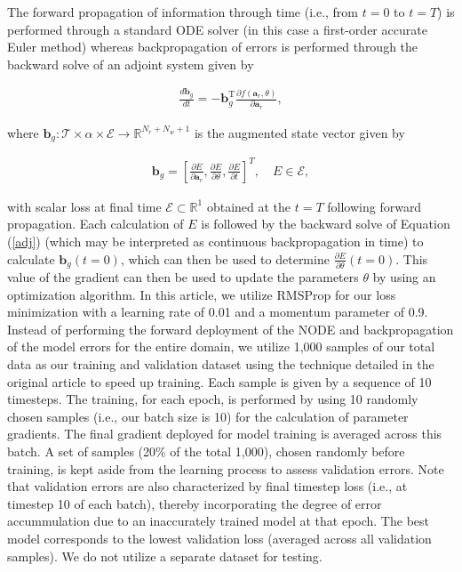 \documentclass[preprint,12pt]{elsarticle}
\begin{document}
The forward propagation of information through time (i.e., from $t=0$ to $t=T$) is performed through a standard ODE solver (in this case a first-order accurate Euler method) whereas backpropagation of errors is performed through the backward solve of an adjoint system given by
\begin{linenomath*}
\begin{align}
\label{adj}
\frac{d \mathbf{b}_g}{d t}=-\mathbf{b}_g^{\mathrm{T}} \frac{\partial f(\mathbf{a}_r, \theta)}{\partial \mathbf{a}_r},
\end{align}
\end{linenomath*}
where $\mathbf{b}_g : \mathcal{T} \times \alpha \times \mathcal{E} \rightarrow \mathbb{R}^{N_r + N_w + 1}$ is the augmented state vector given by 
\begin{linenomath*}
\begin{align}
\mathbf{b}_g = [\frac{\partial E}{\partial \mathbf{a}_r}, \frac{\partial E}{\partial \theta}, \frac{\partial E}{\partial t}]^T, \quad E \in \mathcal{E},
\end{align}
\end{linenomath*}
with scalar loss at final time $\mathcal{E} \subset \mathbb{R}^1$ obtained at the $t=T$ following forward propagation. Each calculation of $E$ is followed by the backward solve of Equation (\ref{adj}) (which may be interpreted as continuous backpropagation in time) to calculate $\mathbf{b}_g (t=0)$, which can then be used to determine $\frac{\partial E}{\partial \theta} (t=0)$. This value of the gradient can then be used to update the parameters $\theta$ by using an optimization algorithm. In this article, we utilize RMSProp for our loss minimization with a learning rate of 0.01 and a momentum parameter of 0.9. Instead of performing the forward deployment of the NODE and backpropagation of the model errors for the entire domain, we utilize 1,000 samples of our total data as our training and validation dataset using the technique detailed in the original article to speed up training. Each sample is given by a sequence of 10 timesteps. The training, for each epoch, is performed by using 10 randomly chosen samples (i.e., our batch size is 10) for the calculation of parameter gradients. The final gradient deployed for model training is averaged across this batch. A set of samples (20\% of the total 1,000), chosen randomly before training, is kept aside from the learning process to assess validation errors. Note that validation errors are also characterized by final timestep loss (i.e., at timestep 10 of each batch), thereby incorporating the degree of error accummulation due to an inaccurately trained model at that epoch. The best model corresponds to the lowest validation loss (averaged across all validation samples). We do not utilize a separate dataset for  testing. 
\end{document}
